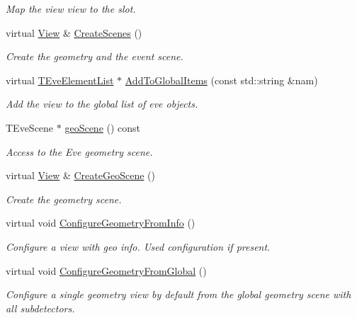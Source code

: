 \begin{DoxyCompactItemize}
\begin{DoxyCompactList}\small\item\em Map the view view to the slot. \end{DoxyCompactList}\item 
virtual \hyperlink{class_d_d4hep_1_1_view}{View} \& \hyperlink{class_d_d4hep_1_1_view_a6c2c1c89a0ad7c6a75379103f8523fdc}{Create\+Scenes} ()
\begin{DoxyCompactList}\small\item\em Create the geometry and the event scene. \end{DoxyCompactList}\item 
virtual \hyperlink{class_t_eve_element_list}{T\+Eve\+Element\+List} $\ast$ \hyperlink{class_d_d4hep_1_1_view_a2fec7a94942a0a6f7c0225ea11a6c212}{Add\+To\+Global\+Items} (const std\+::string \&nam)
\begin{DoxyCompactList}\small\item\em Add the view to the global list of eve objects. \end{DoxyCompactList}\item 
T\+Eve\+Scene $\ast$ \hyperlink{class_d_d4hep_1_1_view_a660fe2299cb39e61b27eee6899cb1eb1}{geo\+Scene} () const
\begin{DoxyCompactList}\small\item\em Access to the Eve geometry scene. \end{DoxyCompactList}\item 
virtual \hyperlink{class_d_d4hep_1_1_view}{View} \& \hyperlink{class_d_d4hep_1_1_view_a8738a88e61d962553fe86472b294028b}{Create\+Geo\+Scene} ()
\begin{DoxyCompactList}\small\item\em Create the geometry scene. \end{DoxyCompactList}\item 
virtual void \hyperlink{class_d_d4hep_1_1_view_af573f4aceff18a93fd91b2678de0ae8e}{Configure\+Geometry\+From\+Info} ()
\begin{DoxyCompactList}\small\item\em Configure a view with geo info. Used configuration if present. \end{DoxyCompactList}\item 
virtual void \hyperlink{class_d_d4hep_1_1_view_a2bf3fea77f89710cbccb03dbf8398501}{Configure\+Geometry\+From\+Global} ()
\begin{DoxyCompactList}\small\item\em Configure a single geometry view by default from the global geometry scene with all subdetectors. \end{DoxyCompactList}\item 

\end{DoxyCompactItemize}
